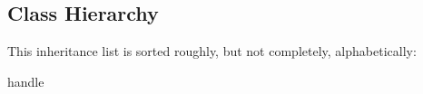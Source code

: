 \subsection{Class Hierarchy}
This inheritance list is sorted roughly, but not completely, alphabetically\+:\begin{DoxyCompactList}
\item handle\begin{DoxyCompactList}
\item {}
\end{DoxyCompactList}
\end{DoxyCompactList}
